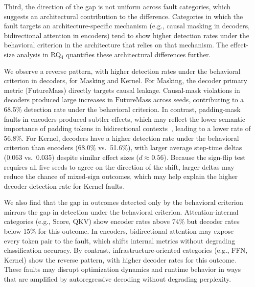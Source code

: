 Third, the direction of the gap is not uniform across fault categories, which suggests an architectural contribution to the difference. Categories in which the fault targets an architecture-specific mechanism (e.g., causal masking in decoders, bidirectional attention in encoders) tend to show higher detection rates under the behavioral criterion in the architecture that relies on that mechanism. The effect-size analysis in RQ$_4$ quantifies these architectural differences further.

We observe a reverse pattern, with higher detection rates under the behavioral criterion in decoders, for Masking and Kernel. For Masking, the decoder primary metric ($\mathrm{FutureMass}$) directly targets causal leakage. Causal-mask violations in decoders produced large increases in $\mathrm{FutureMass}$ across seeds, contributing to a 68.5\% detection rate under the behavioral criterion. In contrast, padding-mask faults in encoders produced subtler effects, which may reflect the lower semantic importance of padding tokens in bidirectional contexts~\cite{kazemnejad2023impact,vaswani2017attention}, leading to a lower rate of 56.8\%. For Kernel, decoders have a higher detection rate under the behavioral criterion than encoders (68.0\% vs.\ 51.6\%), with larger average step-time deltas (0.063 vs.\ 0.035) despite similar effect sizes ($d \approx 0.56$). Because the sign-flip test requires all five seeds to agree on the direction of the shift, larger deltas may reduce the chance of mixed-sign outcomes, which may help explain the higher decoder detection rate for Kernel faults.

We also find that the gap in outcomes detected only by the behavioral criterion mirrors the gap in detection under the behavioral criterion. Attention-internal categories (e.g., Score, QKV) show encoder rates above 74\% but decoder rates below 15\% for this outcome. In encoders, bidirectional attention may expose every token pair to the fault, which shifts internal metrics without degrading classification accuracy. By contrast, infrastructure-oriented categories (e.g., FFN, Kernel) show the reverse pattern, with higher decoder rates for this outcome. These faults may disrupt optimization dynamics and runtime behavior in ways that are amplified by autoregressive decoding without degrading perplexity.

